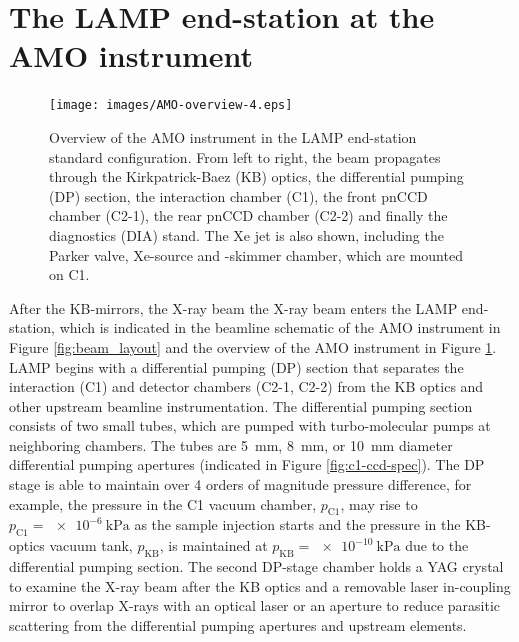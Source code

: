 \section{The LAMP end-station at the AMO instrument}\label{sec:LAMP-endstation}
\begin{figure}
	\centering
		\texttt{[image: images/AMO-overview-4.eps]}
	\caption[Overview of the AMO instrument in the LAMP end-station configuration.]{Overview of the AMO instrument in the LAMP end-station standard configuration. From left to right, the beam propagates through the Kirkpatrick-Baez (KB) optics, the differential pumping (DP) section, the interaction chamber (C1), the front pnCCD chamber (C2-1), the rear pnCCD chamber (C2-2) and finally the diagnostics (DIA) stand. The Xe jet is also shown, including the Parker valve, Xe-source and -skimmer chamber, which are mounted on C1.
}
	\label{fig:LAMP-overview}
\end{figure}
After the KB-mirrors, the X-ray beam the X-ray beam enters the LAMP end-station, which is indicated in the beamline schematic of the AMO instrument in Figure \ref{fig:beam_layout} and the overview of the AMO instrument in Figure \ref{fig:LAMP-overview}. LAMP begins with a differential pumping (DP) section that separates the interaction (C1) and detector chambers (C2-1, C2-2) from the KB optics and other upstream beamline instrumentation. The differential pumping section consists of two small tubes, which are pumped with turbo-molecular pumps at neighboring chambers. The tubes are \SI{5}{\milli\meter}, \SI{8}{\milli\meter}, or \SI{10}{\milli\meter} diameter differential pumping apertures (indicated in Figure \ref{fig:c1-ccd-spec}). The DP stage is able to maintain over 4 orders of magnitude pressure difference, for example, the pressure in the C1 vacuum chamber, $p_{\text{C1}}$, may rise to $p_{\text{C1}}=\SI{e-6}{\kilo\pascal}$ as the sample injection starts and the pressure in the KB-optics vacuum tank, $p_{\text{KB}}$, is maintained at $p_{\text{KB}}=\SI{e-10}{\kilo\pascal}$ due to the differential pumping section. The second DP-stage chamber holds a YAG crystal to examine the X-ray beam after the KB optics and a removable laser in-coupling mirror to overlap X-rays with an optical laser or an aperture to reduce parasitic scattering from the differential pumping apertures and upstream elements.\\[1\baselineskip]
